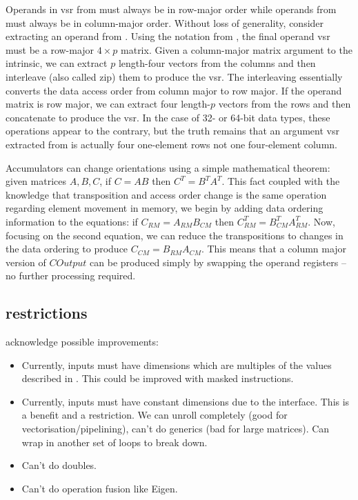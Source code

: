 \documentclass[\main/thesis.tex]{subfiles}
\begin{document}
Operands in \gls{vsr} from  must always be in row-major order while operands from  must always be in column-major order.
Without loss of generality, consider extracting an operand from .
Using the notation from , the final operand \gls{vsr} must be a row-major $4 \times p$ matrix.
Given a column-major matrix argument to the intrinsic, we can extract $p$ length-four vectors from the columns and then interleave (also called zip) them to produce the \gls{vsr}.
The interleaving essentially converts the data access order from column major to row major.
If the operand matrix is row major, we can extract four length-$p$ vectors from the rows and then concatenate to produce the \gls{vsr}.
In the case of 32- or 64-bit data types, these operations appear to the contrary, but the truth remains that an argument \gls{vsr} extracted from  is actually four one-element rows not one four-element column.

Accumulators can change orientations using a simple mathematical theorem: given matrices $A, B, C$, if $C = AB$ then $C^T=B^TA^T$.
This fact coupled with the knowledge that transposition and access order change is the same operation regarding element movement in memory, we begin by adding data ordering information to the equations: if $C_{RM}=A_{RM}B_{CM}$ then $C^T_{RM}=B^T_{CM}A^T_{RM}$.
Now, focusing on the second equation, we can reduce the transpositions to changes in the data ordering to produce $C_{CM}=B_{RM}A_{CM}$.
This means that a column major version of $COutput$ can be produced simply by swapping the operand registers -- no further processing required.

\subsection{restrictions}
\label{sec:restrictions}
acknowledge possible improvements:
\begin{itemize}
  \item Currently, inputs must have dimensions which are multiples of the values described in . This could be improved with masked instructions.
  \item Currently, inputs must have constant dimensions due to the interface. This is a benefit and a restriction. We can unroll completely (good for vectorisation/pipelining), can't do generics (bad for large matrices). Can wrap in another set of loops to break down.
  \item Can't do doubles.
  \item Can't do operation fusion like Eigen.
\end{itemize}
\end{document}
